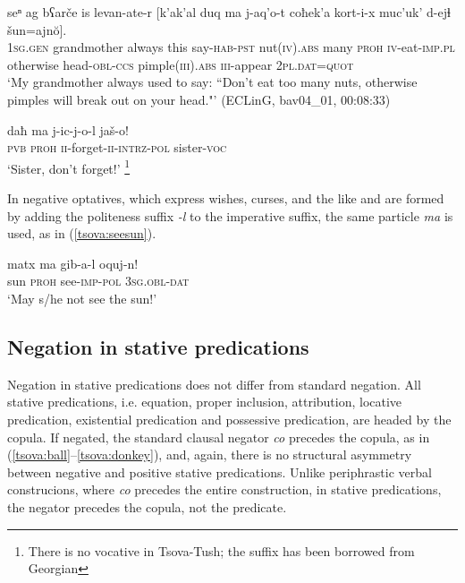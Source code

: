 \documentclass[output=paper,%
colorlinks,citecolor=brown,
showindex
]{langscibook}
\begin{document}
\ea	\label{tsova:pimple}
\gll 	seⁿ ag bʕarče is levan-ate-r [k'ak'al duq ma j-aq'o-t coħek'a kort-i-x muc'uk' d-ejɬ šun=ajnŏ].\\  
	\textsc{1sg.gen} grandmother always this say-\textsc{hab}-\textsc{pst} nut(\textsc{iv}).\textsc{abs} many \textsc{proh} \textsc{iv}-eat-\textsc{imp.pl} otherwise head-\textsc{obl-ccs} pimple(\textsc{iii}).\textsc{abs} \textsc{iii}-appear \textsc{2pl.dat=quot}\\
\glt `My grandmother always used to say: “Don't eat too many nuts, otherwise pimples will break out on your head."' (ECLinG, bav04\_01, 00:08:33)
\z

\ea	\label{tsova:dontforget}
\gll 	daħ	ma	j-ic-j-o-l	jaš-o!\\  
	\textsc{pvb} \textsc{proh} \textsc{ii}-forget-\textsc{ii-intrz-pol} sister-\textsc{voc}  
\\
\glt `Sister, don't forget!'  \citep[146]{Mikeladze2011}\footnote{There is no vocative in Tsova-Tush; the suffix has been borrowed from Georgian}
\z

In negative optatives, which express wishes, curses, and the like and are formed by adding the politeness suffix \textit{-l} to the imperative suffix, the same particle \textit{ma} is used, as in (\ref{tsova:seesun}).

\ea	\label{tsova:seesun}
\gll 	matx	ma	gib-a-l	oquj-n!\\  
	sun \textsc{proh} see-\textsc{imp-pol} \textsc{3sg.obl-dat}\\
\glt `May s/he not see the sun!' \citep[182]{HoliskyGagua1994} 
\z

\subsection{Negation in stative predications}
\label{tsova:stative}

Negation in stative predications does not differ from standard negation. All stative predications, i.e. equation, proper inclusion, attribution, locative predication, existential predication and possessive predication, are headed by the copula. If negated, the standard clausal negator \textit{co} precedes the copula, as in (\ref{tsova:ball}–\ref{tsova:donkey}), and, again, there is no structural asymmetry between negative and positive stative predications. Unlike periphrastic verbal construcions, where  \textit{co} precedes the entire construction, in stative predications, the negator precedes the copula, not the predicate.
\end{document}
